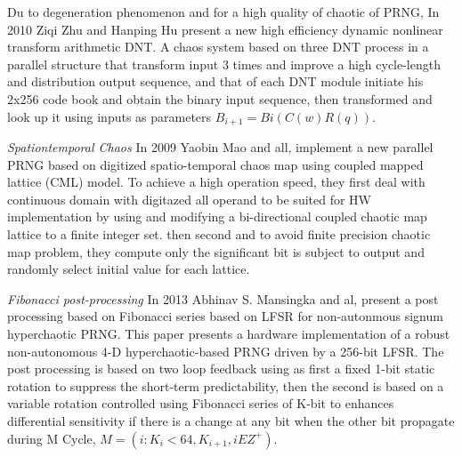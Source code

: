 Du to degeneration phenomenon and for a high quality of chaotic of PRNG, In 2010 Ziqi Zhu and Hanping Hu present a new high efficiency dynamic nonlinear transform arithmetic DNT. A chaos system based on three DNT process in a parallel structure that transform input 3 times and improve a high cycle-length and distribution output sequence, and that of each DNT module initiate his 2x256 code book and obtain the binary input sequence, then transformed and look up it using inputs as parameters $B_{i+1}= Bi(C(w)R(q))$. 

\textit{Spationtemporal Chaos} In 2009 Yaobin Mao and all, implement a new parallel PRNG based on digitized spatio-temporal chaos map using  coupled mapped lattice (CML) model. To achieve a high operation speed, they first deal with continuous domain with digitazed all operand to be suited for HW implementation by using and modifying a bi-directional coupled chaotic map lattice to a finite integer set. then second and to avoid finite precision chaotic map problem, they compute only the significant bit is subject to output and randomly select initial value for each lattice.  
 
\textit{Fibonacci post-processing} In 2013 Abhinav S. Mansingka and al, present a post processing based on Fibonacci series based on LFSR for non-autonmous signum hyperchaotic PRNG. This paper presents a hardware implementation of a robust non-autonomous 4-D hyperchaotic-based PRNG driven by a 256-bit LFSR. The post processing is based on two loop feedback using as first a fixed 1-bit static rotation to suppress the short-term predictability, then the second is based on  a variable rotation controlled using Fibonacci series of K-bit to enhances differential sensitivity if there is a change at any bit when the other bit propagate during M Cycle, $M=({i: K_{i} < 64, K_{i+1}, iEZ^{+}})$.